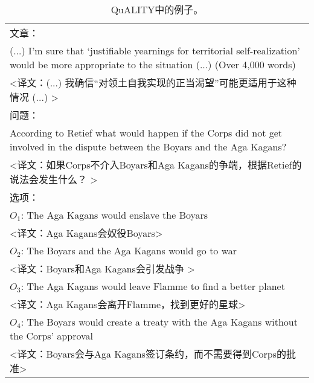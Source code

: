 \begin{table}[htbp]
    \centering
    \begin{tabular}{p{420pt}}
    \hline
    文章： \\
    (...) I'm sure that `justifiable yearnings for territorial self-realization' would be more appropriate to the situation (...) (Over 4,000 words) \\
    <译文：(...) 我确信“对领土自我实现的正当渴望”可能更适用于这种情况 (...) > \\
    \hline
    问题： \\
    According to Retief what would happen if the Corps did not get involved in the dispute between the Boyars and the Aga Kagans? \\
    <译文：如果Corps不介入Boyars和Aga Kagans的争端，根据Retief的说法会发生什么？ > \\
    \hline
    选项： \\
    $O_1$: \textcolor[rgb]{0.2,0,1}{The Aga Kagans would enslave the Boyars} \\
    <译文：Aga Kagans会奴役Boyars> \\
    $O_2$: \textcolor[rgb]{1,0,0.2}{The Boyars and the Aga Kagans would go to war} \\
    <译文：Boyars和Aga Kagans会引发战争 > \\
    $O_3$: The Aga Kagans would leave Flamme to find a better planet \\
    <译文：Aga Kagans会离开Flamme，找到更好的星球> \\
    \textbf{$O_4$}: The Boyars would create a treaty with the Aga Kagans without the Corps' approval \\
    <译文：Boyars会与Aga Kagans签订条约，而不需要得到Corps的批准> \\
    \hline
    \end{tabular}
    \caption{\label{tab:4-1}
    QuALITY中的例子。
    }
\end{table}
